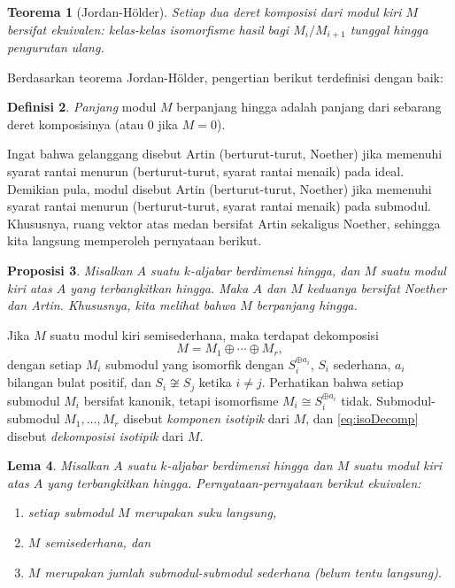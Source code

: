 \documentclass[12pt]{article}
\theoremstyle{plain}
\newtheorem{theorem}{Teorema}[section]
\newtheorem{lemma}[theorem]{Lema}
\newtheorem{proposition}[theorem]{Proposisi}
\theoremstyle{definition}
\newtheorem{definition}[theorem]{Definisi}
\theoremstyle{remark}
\numberwithin{equation}{section}
\begin{document}
\begin{theorem}[Jordan-H\"older]
Setiap dua deret komposisi dari modul kiri $M$ bersifat \emph{ekuivalen}:
kelas-kelas isomorfisme hasil bagi $M_i/M_{i+1}$
tunggal hingga pengurutan ulang.
\end{theorem}

Berdasarkan teorema Jordan-H\"older, pengertian berikut
terdefinisi dengan baik:

\begin{definition}
\emph{Panjang} modul $M$ berpanjang hingga adalah panjang dari sebarang
deret komposisinya (atau $0$ jika $M=0$).
\end{definition}

Ingat bahwa gelanggang disebut Artin (berturut-turut, Noether) jika memenuhi
syarat rantai menurun (berturut-turut, syarat rantai menaik) pada ideal.
Demikian pula, modul disebut Artin (berturut-turut, Noether) jika memenuhi
syarat rantai menurun (berturut-turut, syarat rantai menaik) pada
submodul. Khususnya, ruang vektor atas medan bersifat Artin
sekaligus Noether, sehingga kita langsung memperoleh pernyataan berikut.

\begin{proposition}
Misalkan $A$ suatu $k$-aljabar berdimensi hingga,
dan $M$ suatu modul kiri atas $A$ yang terbangkitkan hingga.
Maka $A$ dan $M$ keduanya bersifat Noether dan Artin.
Khususnya, kita melihat bahwa $M$ berpanjang hingga.
\end{proposition}

Jika $M$ suatu modul kiri semisederhana, maka terdapat dekomposisi
\begin{equation} \label{eq:isoDecomp}
M = M_1 \oplus \cdots \oplus M_r,
\end{equation}
dengan setiap $M_i$ submodul yang isomorfik dengan $S_i^{\oplus a_i}$,
$S_i$ sederhana, $a_i$ bilangan bulat positif,
dan $S_i \not\cong S_j$ ketika $i \ne j$.
Perhatikan bahwa setiap submodul $M_i$ bersifat kanonik, tetapi
isomorfisme $M_i \cong S_i^{\oplus a_i}$ tidak.
Submodul-submodul $M_1, \ldots, M_r$ disebut \emph{komponen
isotipik} dari $M$, dan \eqref{eq:isoDecomp} disebut \emph{dekomposisi
isotipik} dari $M$.

\begin{lemma} \label{lem:ssModule}
Misalkan $A$ suatu $k$-aljabar berdimensi hingga dan $M$ suatu modul kiri
atas $A$ yang terbangkitkan hingga.
Pernyataan-pernyataan berikut ekuivalen:
\begin{enumerate}
\item[(a)] setiap submodul $M$ merupakan suku langsung,
\item[(b)] $M$ semisederhana, dan
\item[(c)] $M$ merupakan jumlah submodul-submodul sederhana (belum tentu langsung).
\end{enumerate}
\end{lemma}
\end{document}
